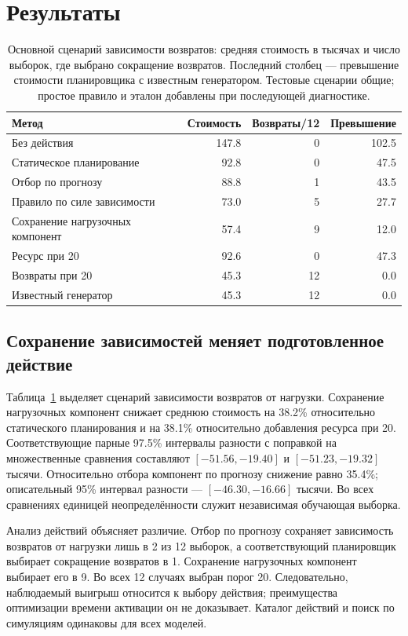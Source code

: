 \section{Результаты}
\begin{table}[t]\caption{Основной сценарий зависимости возвратов: средняя стоимость в тысячах и число выборок, где выбрано сокращение возвратов. Последний столбец --- превышение стоимости планировщика с известным генератором. Тестовые сценарии общие; простое правило и эталон добавлены при последующей диагностике.}\label{tab:primary}\centering\small\setlength{\tabcolsep}{3pt}
\begin{tabular}{p{}rrr}\toprule
Метод & Стоимость & Возвраты/12 & Превышение\\\midrule
Без действия & 147.8 & 0 & 102.5 \\
Статическое планирование & 92.8 & 0 & 47.5 \\
Отбор по прогнозу & 88.8 & 1 & 43.5 \\
Правило по силе зависимости & 73.0 & 5 & 27.7 \\
Сохранение нагрузочных компонент & 57.4 & 9 & 12.0 \\
Ресурс при 20 & 92.6 & 0 & 47.3 \\
Возвраты при 20 & 45.3 & 12 & 0.0 \\
Известный генератор & 45.3 & 12 & 0.0 \\
\bottomrule\end{tabular}\end{table}
\subsection{Сохранение зависимостей меняет подготовленное действие}
Таблица~\ref{tab:primary} выделяет сценарий зависимости возвратов от нагрузки. Сохранение нагрузочных компонент снижает среднюю стоимость на 38.2\% относительно статического планирования и на 38.1\% относительно добавления ресурса при 20. Соответствующие парные 97.5\% интервалы разности с поправкой на множественные сравнения составляют $[-51.56,-19.40]$ и $[-51.23,-19.32]$ тысячи. Относительно отбора компонент по прогнозу снижение равно 35.4\%; описательный 95\% интервал разности --- $[-46.30,-16.66]$ тысячи. Во всех сравнениях единицей неопределённости служит независимая обучающая выборка.

Анализ действий объясняет различие. Отбор по прогнозу сохраняет зависимость возвратов от нагрузки лишь в 2 из 12 выборок, а соответствующий планировщик выбирает сокращение возвратов в 1. Сохранение нагрузочных компонент выбирает его в 9. Во всех 12 случаях выбран порог 20. Следовательно, наблюдаемый выигрыш относится к выбору действия; преимущества оптимизации времени активации он не доказывает. Каталог действий и поиск по симуляциям одинаковы для всех моделей.

